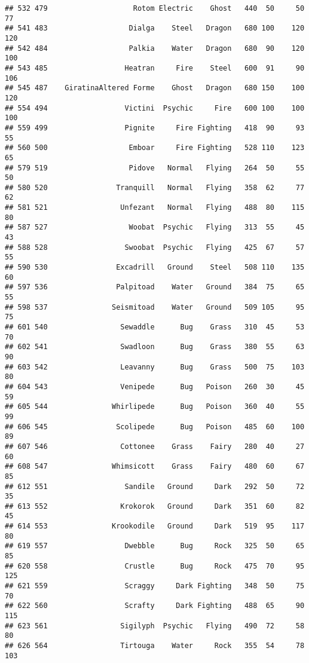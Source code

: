 \documentclass[
]{article}
\begin{document}
\begin{verbatim}
## 532 479                    Rotom Electric    Ghost   440  50     50      77
## 541 483                   Dialga    Steel   Dragon   680 100    120     120
## 542 484                   Palkia    Water   Dragon   680  90    120     100
## 543 485                  Heatran     Fire    Steel   600  91     90     106
## 545 487    GiratinaAltered Forme    Ghost   Dragon   680 150    100     120
## 554 494                  Victini  Psychic     Fire   600 100    100     100
## 559 499                  Pignite     Fire Fighting   418  90     93      55
## 560 500                   Emboar     Fire Fighting   528 110    123      65
## 579 519                   Pidove   Normal   Flying   264  50     55      50
## 580 520                Tranquill   Normal   Flying   358  62     77      62
## 581 521                 Unfezant   Normal   Flying   488  80    115      80
## 587 527                   Woobat  Psychic   Flying   313  55     45      43
## 588 528                  Swoobat  Psychic   Flying   425  67     57      55
## 590 530                Excadrill   Ground    Steel   508 110    135      60
## 597 536                Palpitoad    Water   Ground   384  75     65      55
## 598 537               Seismitoad    Water   Ground   509 105     95      75
## 601 540                 Sewaddle      Bug    Grass   310  45     53      70
## 602 541                 Swadloon      Bug    Grass   380  55     63      90
## 603 542                 Leavanny      Bug    Grass   500  75    103      80
## 604 543                 Venipede      Bug   Poison   260  30     45      59
## 605 544               Whirlipede      Bug   Poison   360  40     55      99
## 606 545                Scolipede      Bug   Poison   485  60    100      89
## 607 546                 Cottonee    Grass    Fairy   280  40     27      60
## 608 547               Whimsicott    Grass    Fairy   480  60     67      85
## 612 551                  Sandile   Ground     Dark   292  50     72      35
## 613 552                 Krokorok   Ground     Dark   351  60     82      45
## 614 553               Krookodile   Ground     Dark   519  95    117      80
## 619 557                  Dwebble      Bug     Rock   325  50     65      85
## 620 558                  Crustle      Bug     Rock   475  70     95     125
## 621 559                  Scraggy     Dark Fighting   348  50     75      70
## 622 560                  Scrafty     Dark Fighting   488  65     90     115
## 623 561                 Sigilyph  Psychic   Flying   490  72     58      80
## 626 564                 Tirtouga    Water     Rock   355  54     78     103

\end{verbatim}
\end{document}
